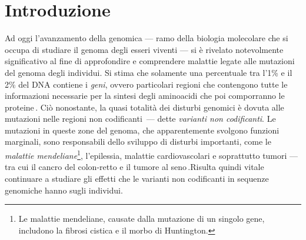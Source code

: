 
\chapter{Introduzione}\label{chp:introduction}

Ad oggi l'avanzamento della genomica — ramo della biologia molecolare che si occupa di studiare il genoma degli esseri viventi — si è rivelato notevolmente significativo al fine di approfondire e comprendere malattie legate alle mutazioni del genoma degli individui. Si stima che solamente una percentuale tra l'1\% e il 2\% del DNA contiene i \textsl{geni}, ovvero particolari regioni che contengono tutte le informazioni necessarie per la sintesi degli aminoacidi che poi comporranno le proteine\,\cite{sahu2011identification, pollard2022cell}. Ciò nonostante, la quasi totalità dei disturbi genomici è dovuta alle mutazioni nelle regioni non codificanti\,\cite{zhang2015non} — dette \textsl{varianti non codificanti}. Le mutazioni in queste zone del genoma, che apparentemente svolgono funzioni marginali, sono responsabili dello sviluppo di disturbi importanti, come le \textsl{malattie mendeliane}\footnote{Le malattie mendeliane, causate dalla mutazione di un singolo gene, includono la fibrosi cistica e il morbo di Huntington.}, l'epilessia, malattie cardiovascolari e soprattutto tumori — tra cui il cancro del colon-retto e il tumore al seno\,\cite{french2020role, chial2008mendelian, pagni2022non, kapoor2014enhancer, zhang2015non, khurana2016role, tian2019systematic, bojesen2013multiple, michailidou2017association}.Risulta quindi vitale continuare a studiare gli effetti che le varianti non codificanti in sequenze genomiche hanno sugli individui.

